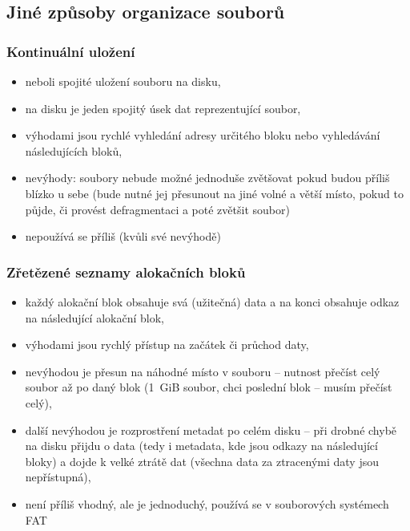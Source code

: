 \documentclass[a4paper, 11pt]{article}
\begin{document}
\subsection{Jiné způsoby organizace souborů}
\subsubsection{Kontinuální uložení}
\begin{itemize}
    \item neboli spojité uložení souboru na disku,
    \item na disku je jeden spojitý úsek dat reprezentující soubor,
    \item výhodami jsou rychlé vyhledání adresy určitého bloku nebo vyhledávání následujících bloků,
    \item nevýhody: soubory nebude možné jednoduše zvětšovat pokud budou příliš blízko u sebe (bude nutné jej přesunout na jiné volné a větší místo, pokud to půjde, či provést defragmentaci a poté zvětšit soubor)
    \item nepoužívá se příliš (kvůli své nevýhodě)
\end{itemize}

\subsubsection{Zřetězené seznamy alokačních bloků}
\begin{itemize}
    \item každý alokační blok obsahuje svá (užitečná) data a na konci obsahuje odkaz na následující alokační blok,
    \item výhodami jsou rychlý přístup na začátek či průchod daty,
    \item nevýhodou je přesun na náhodné místo v souboru -- nutnost přečíst celý soubor až po daný blok (1~GiB soubor, chci poslední blok -- musím přečíst celý),
    \item další nevýhodou je rozprostření metadat po celém disku -- při drobné chybě na disku přijdu o data (tedy i metadata, kde jsou odkazy na následující bloky) a dojde k velké ztrátě dat (všechna data za ztracenými daty jsou nepřístupná),
    \item není příliš vhodný, ale je jednoduchý, používá se v souborových systémech FAT
\end{itemize}
\end{document}
